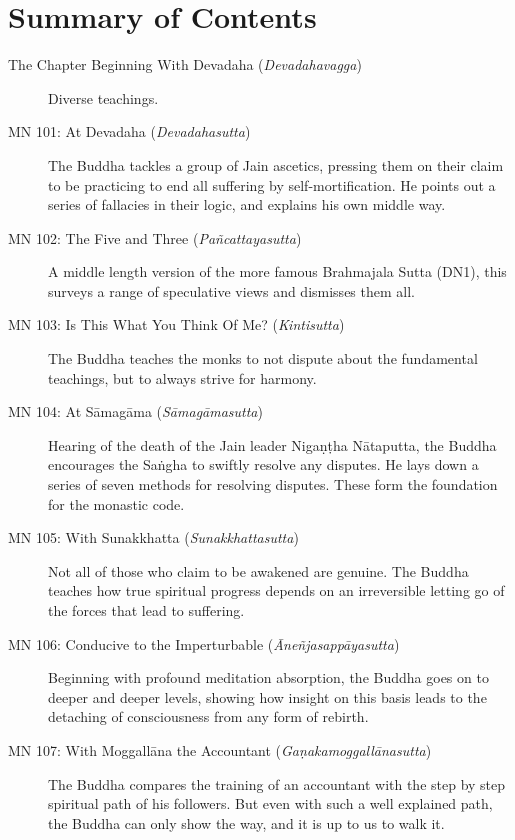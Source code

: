 \documentclass[12pt,openany]{book}%
\begin{document}
\newpage

\setlength{\parindent}{1.5em}%
\tableofcontents
\newpage
\pagestyle{fancy}
%
\chapter*{Summary of Contents}

\begin{description}%
\item[The Chapter Beginning With Devadaha (\textit{\textsanskrit{Devadahavagga}})] Diverse teachings.%
\item[MN 101: At Devadaha (\textit{\textsanskrit{Devadahasutta}})] The Buddha tackles a group of Jain ascetics, pressing them on their claim to be practicing to end all suffering by self-mortification. He points out a series of fallacies in their logic, and explains his own middle way.%
\item[MN 102: The Five and Three (\textit{\textsanskrit{Pañcattayasutta}})] A middle length version of the more famous Brahmajala Sutta (DN1), this surveys a range of speculative views and dismisses them all.%
\item[MN 103: Is This What You Think Of Me? (\textit{\textsanskrit{Kintisutta}})] The Buddha teaches the monks to not dispute about the fundamental teachings, but to always strive for harmony.%
\item[MN 104: At \textsanskrit{Sāmagāma} (\textit{\textsanskrit{Sāmagāmasutta}})] Hearing of the death of the Jain leader \textsanskrit{Nigaṇṭha} \textsanskrit{Nātaputta}, the Buddha encourages the \textsanskrit{Saṅgha} to swiftly resolve any disputes. He lays down a series of seven methods for resolving disputes. These form the foundation for the monastic code.%
\item[MN 105: With Sunakkhatta (\textit{\textsanskrit{Sunakkhattasutta}})] Not all of those who claim to be awakened are genuine. The Buddha teaches how true spiritual progress depends on an irreversible letting go of the forces that lead to suffering.%
\item[MN 106: Conducive to the Imperturbable (\textit{\textsanskrit{Āneñjasappāyasutta}})] Beginning with profound meditation absorption, the Buddha goes on to deeper and deeper levels, showing how insight on this basis leads to the detaching of consciousness from any form of rebirth.%
\item[MN 107: With \textsanskrit{Moggallāna} the Accountant (\textit{\textsanskrit{Gaṇakamoggallānasutta}})] The Buddha compares the training of an accountant with the step by step spiritual path of his followers. But even with such a well explained path, the Buddha can only show the way, and it is up to us to walk it.%

\end{description}
\end{document}
